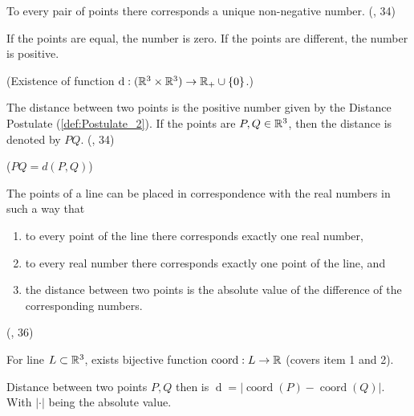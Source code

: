 \begin{definition}\label{def:Postulate_2}
  \leanok
  To every pair of points there corresponds a unique non-negative number. (\cite{SMSGGeometry}, 34)

  If the points are equal, the number is zero.
  If the points are different, the number is positive.

  (Existence of function $\operatorname{d}: (\mathbb{R}^3\times\mathbb{R}^3) \to \mathbb{R}_+ \cup \left\{ 0 \right\}$.)
\end{definition}

\begin{definition}[Distance]\label{def:Distance}
  \leanok
  The distance between two points is the positive number given by the Distance Postulate (\ref{def:Postulate_2}).
  If the points are $P,Q \in \mathbb{R}^3$, then the distance is denoted by $PQ$.
  (\cite{SMSGGeometry}, 34)

  ($PQ=d(P,Q)$)
\end{definition}



\begin{definition}\label{def:Postulate_3}
  \leanok
  The points of a line can be placed in correspondence with the real numbers in such a way that
  \begin{enumerate}
    \item to every point of the line there corresponds exactly one real number,
    \item to every real number there corresponds exactly one point of the line, and
    \item the distance between two points is the absolute value of the difference of the corresponding numbers.
  \end{enumerate}
  (\cite{SMSGGeometry}, 36)


  For line $L \subset \mathbb{R}^3$, exists bijective function $\operatorname{coord}:L \to \mathbb{R}$ (covers item 1 and 2).

  Distance between two points $P,Q$ then is $\operatorname{d}=|\operatorname{coord}(P)-\operatorname{coord}(Q)|$.
  With $|\cdot |$ being the absolute value.
\end{definition}

